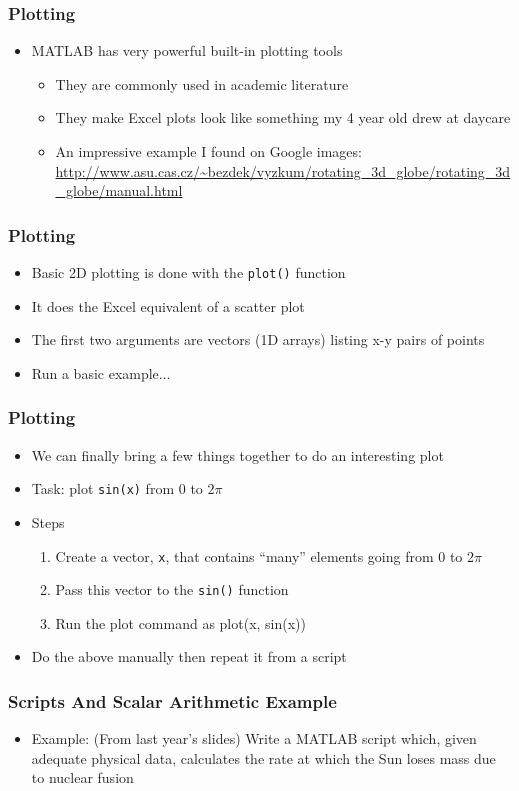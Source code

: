 \documentclass[14pt]{beamer}
\begin{document}
\begin{frame}
\frametitle{Plotting}
\begin{itemize}
\item MATLAB has very powerful built-in plotting tools
	\begin{itemize}
		\item They are commonly used in academic literature
		\item They make Excel plots look like something my 4 year old drew at daycare
		\item An impressive example I found on Google images: \url{http://www.asu.cas.cz/~bezdek/vyzkum/rotating_3d_globe/rotating_3d_globe/manual.html}
	\end{itemize}
\end{itemize}
\end{frame}

\begin{frame}
\frametitle{Plotting}
\begin{itemize}
\item Basic 2D plotting is done with the \texttt{plot()} function
\item It does the Excel equivalent of a scatter plot
\item The first two arguments are vectors (1D arrays) listing x-y pairs of points
\item Run a basic example...
\end{itemize}
\end{frame}

\begin{frame}
\frametitle{Plotting}
\begin{itemize}
\item We can finally bring a few things together to do an interesting plot
\pause
\item Task: plot \texttt{sin(x)} from $0$ to $2\pi$
\item Steps
	\begin{enumerate}
		\item Create a vector, \texttt{x}, that contains ``many'' elements going from $0$ to $2\pi$
		\item Pass this vector to the \texttt{sin()} function
		\item Run the plot command as plot(x, sin(x))
	\end{enumerate}
\item Do the above manually then repeat it from a script
\end{itemize}
\end{frame}

\begin{frame}
\frametitle{Scripts And Scalar Arithmetic Example}
\begin{itemize}
\item Example: (From last year's slides) Write a MATLAB script which, given adequate physical data, calculates the rate at which the Sun loses mass due to nuclear fusion 
\end{itemize}
\end{frame}
\end{document}
